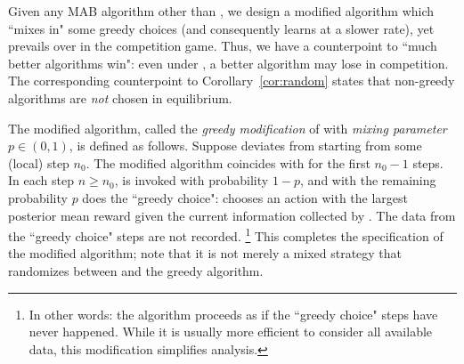 
Given any \bmonotone MAB algorithm \alg other than \DynGreedy, we design a modified algorithm which ``mixes in" some greedy choices (and consequently learns at a slower rate), yet prevails over \alg in the competition game. Thus, we have a counterpoint to ``much better algorithms win": even under \HardMaxRandom, a better algorithm may lose in competition. The corresponding counterpoint to Corollary~\ref{cor:random} states that non-greedy algorithms are \emph{not} chosen in equilibrium.

The modified algorithm, called the \emph{greedy modification} of \alg  with \emph{mixing parameter} $p\in (0,1)$, is defined as follows. Suppose \alg deviates from \DynGreedy starting from some (local) step $n_0$.
The modified algorithm coincides with \DynGreedy
for the first $n_0-1$ steps.
In each step $n\geq n_0$, \alg is invoked with probability
  $1-p$, and with the remaining probability $p$ does the ``greedy
  choice": chooses an action with the largest posterior mean reward
  given the current information collected by \alg.
The data from the ``greedy choice" steps are not recorded.%
\footnote{In other words: the algorithm proceeds as if the ``greedy choice" steps have never happened.  While it is usually more efficient to consider all available data, this modification simplifies analysis.}
This completes the specification of the modified algorithm; note that it is not merely
a mixed strategy that randomizes between \alg and the greedy algorithm.



